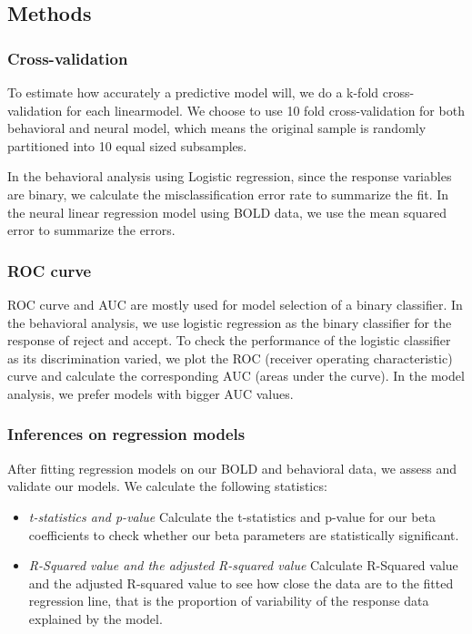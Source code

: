 \documentclass[11pt]{article}
\begin{document}
\subsection{Methods}

\subsubsection{Cross-validation}

To estimate how accurately a predictive model will, we do a k-fold 
cross-validation for each linearmodel. We choose to use 10 fold 
cross-validation for both behavioral and neural model,
which means the original sample is randomly partitioned into 10 equal sized 
subsamples. 
\par
In the behavioral analysis using Logistic regression, since the response 
variables are binary, we calculate the misclassification error rate to 
summarize the fit. In the neural linear regression model using BOLD data, we 
use the mean squared error to summarize the errors.

\subsubsection{ROC curve}

ROC curve and AUC are mostly used for model selection of a binary classifier. 
In the behavioral analysis, we use logistic regression as the binary 
classifier for the response of reject and accept. To check the performance of 
the logistic classifier as its discrimination varied, we plot the ROC 
(receiver operating characteristic) curve and calculate the corresponding AUC 
(areas under the curve). In the model analysis, we prefer models with bigger 
AUC values.

\subsubsection{Inferences on regression models}

After fitting regression models on our BOLD and behavioral data, we assess 
and validate our models. We calculate the following statistics:
\begin{itemize}
\item \emph{t-statistics and p-value} Calculate the t-statistics and p-value for 
our beta coefficients to check whether our beta parameters are statistically 
significant.
\item \emph{R-Squared value and the adjusted R-squared value} Calculate 
R-Squared value and the adjusted R-squared value to see how close the data are 
to the fitted regression line, that is the proportion of variability of the 
response data explained by the model.
\end{itemize}
\end{document}
